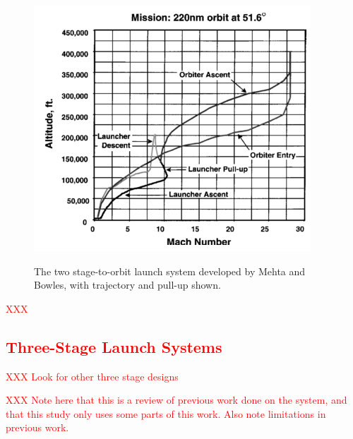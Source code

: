\begin{figure}[ht]
\begin{minipage}[b]{0.3\textwidth}
		\label{fig:MehtaVehicle}
	\end{minipage}	
	\begin{minipage}[b]{0.6\textwidth}
		\includegraphics[width=\linewidth]{"figures/2_literature-review/Mehta Trajectory"}
		
		\label{fig:MehtaTrajectory}
	\end{minipage}
	\caption{The two stage-to-orbit launch system developed by Mehta and Bowles\cite{Mehta2001}, with trajectory and pull-up shown.}
	\label{fig:Mehta}
\end{figure}


  \textcolor{red}{XXX 
  \subsection{Three-Stage Launch Systems}
}
\textcolor{red}{XXX Look for other three stage designs}
	
\textcolor{red}{XXX Note here that this is a review of previous work done on the system, and that this study only uses some parts of this work. Also note limitations in previous work.}

